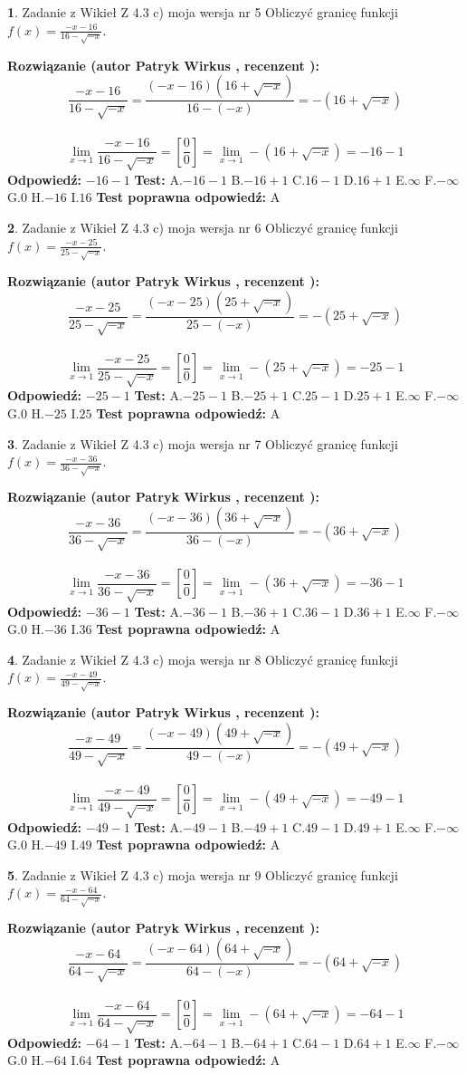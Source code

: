 \documentclass[12pt, a4paper]{article}
\theoremstyle{definition} %
\newtheorem{zad}{}
\newcommand{\zadStart}[1]{\begin{zad}#1\newline}
\newcommand{\zadStop}{\end{zad}}
\newcommand{\rozwStart}[2]{\noindent \textbf{Rozwiązanie (autor #1 , recenzent #2): }\newline}
\newcommand{\rozwStop}{\newline}
\newcommand{\odpStart}{\noindent \textbf{Odpowiedź:}\newline}
\newcommand{\odpStop}{\newline}
\newcommand{\testStart}{\noindent \textbf{Test:}\newline}
\newcommand{\testStop}{\newline}
\newcommand{\kluczStart}{\noindent \textbf{Test poprawna odpowiedź:}\newline}
\newcommand{\kluczStop}{\newline}
\begin{document}
\zadStart{Zadanie z Wikieł Z 4.3 c) moja wersja nr 5}
Obliczyć granicę funkcji $f(x)=\frac{-x-16}{16-\sqrt{-x}}$.
\zadStop
\rozwStart{Patryk Wirkus}{}
$$\frac{-x-16}{16-\sqrt{-x}}=\frac{(-x-16)(16+\sqrt{-x})}{16-(-x)}=-(16+\sqrt{-x})$$
\\
$$\lim\limits_{x\to1}\frac{-x-16}{16-\sqrt{-x}}=[\frac{0}{0}]=\lim\limits_{x\to1}-(16+\sqrt{-x}) =-16-1$$
\rozwStop
\odpStart
$-16-1$
\odpStop
\testStart
A.$-16-1$
B.$-16+1$
C.$16-1$
D.$16+1$
E.$\infty$
F.$-\infty$
G.$0$
H.$-16$
I.$16$
\testStop
\kluczStart
A
\kluczStop



\zadStart{Zadanie z Wikieł Z 4.3 c) moja wersja nr 6}
Obliczyć granicę funkcji $f(x)=\frac{-x-25}{25-\sqrt{-x}}$.
\zadStop
\rozwStart{Patryk Wirkus}{}
$$\frac{-x-25}{25-\sqrt{-x}}=\frac{(-x-25)(25+\sqrt{-x})}{25-(-x)}=-(25+\sqrt{-x})$$
\\
$$\lim\limits_{x\to1}\frac{-x-25}{25-\sqrt{-x}}=[\frac{0}{0}]=\lim\limits_{x\to1}-(25+\sqrt{-x}) =-25-1$$
\rozwStop
\odpStart
$-25-1$
\odpStop
\testStart
A.$-25-1$
B.$-25+1$
C.$25-1$
D.$25+1$
E.$\infty$
F.$-\infty$
G.$0$
H.$-25$
I.$25$
\testStop
\kluczStart
A
\kluczStop



\zadStart{Zadanie z Wikieł Z 4.3 c) moja wersja nr 7}
Obliczyć granicę funkcji $f(x)=\frac{-x-36}{36-\sqrt{-x}}$.
\zadStop
\rozwStart{Patryk Wirkus}{}
$$\frac{-x-36}{36-\sqrt{-x}}=\frac{(-x-36)(36+\sqrt{-x})}{36-(-x)}=-(36+\sqrt{-x})$$
\\
$$\lim\limits_{x\to1}\frac{-x-36}{36-\sqrt{-x}}=[\frac{0}{0}]=\lim\limits_{x\to1}-(36+\sqrt{-x}) =-36-1$$
\rozwStop
\odpStart
$-36-1$
\odpStop
\testStart
A.$-36-1$
B.$-36+1$
C.$36-1$
D.$36+1$
E.$\infty$
F.$-\infty$
G.$0$
H.$-36$
I.$36$
\testStop
\kluczStart
A
\kluczStop



\zadStart{Zadanie z Wikieł Z 4.3 c) moja wersja nr 8}
Obliczyć granicę funkcji $f(x)=\frac{-x-49}{49-\sqrt{-x}}$.
\zadStop
\rozwStart{Patryk Wirkus}{}
$$\frac{-x-49}{49-\sqrt{-x}}=\frac{(-x-49)(49+\sqrt{-x})}{49-(-x)}=-(49+\sqrt{-x})$$
\\
$$\lim\limits_{x\to1}\frac{-x-49}{49-\sqrt{-x}}=[\frac{0}{0}]=\lim\limits_{x\to1}-(49+\sqrt{-x}) =-49-1$$
\rozwStop
\odpStart
$-49-1$
\odpStop
\testStart
A.$-49-1$
B.$-49+1$
C.$49-1$
D.$49+1$
E.$\infty$
F.$-\infty$
G.$0$
H.$-49$
I.$49$
\testStop
\kluczStart
A
\kluczStop



\zadStart{Zadanie z Wikieł Z 4.3 c) moja wersja nr 9}
Obliczyć granicę funkcji $f(x)=\frac{-x-64}{64-\sqrt{-x}}$.
\zadStop
\rozwStart{Patryk Wirkus}{}
$$\frac{-x-64}{64-\sqrt{-x}}=\frac{(-x-64)(64+\sqrt{-x})}{64-(-x)}=-(64+\sqrt{-x})$$
\\
$$\lim\limits_{x\to1}\frac{-x-64}{64-\sqrt{-x}}=[\frac{0}{0}]=\lim\limits_{x\to1}-(64+\sqrt{-x}) =-64-1$$
\rozwStop
\odpStart
$-64-1$
\odpStop
\testStart
A.$-64-1$
B.$-64+1$
C.$64-1$
D.$64+1$
E.$\infty$
F.$-\infty$
G.$0$
H.$-64$
I.$64$
\testStop
\kluczStart
A
\kluczStop
\end{document}
